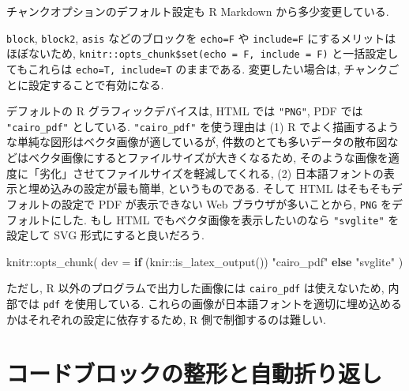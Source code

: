 \documentclass[
  xelatex,ja=standard,jafont=noto]{bxjsbook}
\newenvironment{Shaded}{\begin{snugshade}}{\end{snugshade}}
\newcommand{\AttributeTok}[1]{\textcolor[rgb]{0.77,0.63,0.00}{#1}}
\newcommand{\ControlFlowTok}[1]{\textcolor[rgb]{0.13,0.29,0.53}{\textbf{#1}}}
\newcommand{\FunctionTok}[1]{\textcolor[rgb]{0.00,0.00,0.00}{#1}}
\newcommand{\NormalTok}[1]{#1}
\newcommand{\SpecialCharTok}[1]{\textcolor[rgb]{0.00,0.00,0.00}{#1}}
\newcommand{\StringTok}[1]{\textcolor[rgb]{0.31,0.60,0.02}{#1}}
\theoremstyle{definition}
\theoremstyle{definition}
\theoremstyle{definition}
\theoremstyle{definition}
\theoremstyle{remark}
\begin{document}
チャンクオプションのデフォルト設定も R Markdown から多少変更している.

\texttt{block}, \texttt{block2}, \texttt{asis} などのブロックを
\texttt{echo=F} や \texttt{include=F} にするメリットはほぼないため,
\texttt{knitr::opts\_chunk\$set(echo\ =\ F,\ include\ =\ F)}
と一括設定してもこれらは \texttt{echo=T,\ include=T} のままである.
変更したい場合は, チャンクごとに設定することで有効になる.

デフォルトの R グラフィックデバイスは, HTML では \texttt{"PNG"}, PDF
では \texttt{"cairo\_pdf"} としている. \texttt{"cairo\_pdf"}
を使う理由は (1) R
でよく描画するような単純な図形はベクタ画像が適しているが,
件数のとても多いデータの散布図などはベクタ画像にするとファイルサイズが大きくなるため,
そのような画像を適度に「劣化」させてファイルサイズを軽減してくれる, (2)
日本語フォントの表示と埋め込みの設定が最も簡単, というものである. そして
HTML はそもそもデフォルトの設定で PDF が表示できない Web
ブラウザが多いことから, \texttt{PNG} をデフォルトにした. もし HTML
でもベクタ画像を表示したいのなら \texttt{"svglite"} を設定して SVG
形式にすると良いだろう.

\begin{Shaded}
\begin{Highlighting}[numbers=left,,]
\NormalTok{knitr}\SpecialCharTok{::}\FunctionTok{opts\_chunk}\NormalTok{(}
  \AttributeTok{dev =} \ControlFlowTok{if}\NormalTok{ (knir}\SpecialCharTok{::}\FunctionTok{is\_latex\_output}\NormalTok{()) }\StringTok{"cairo\_pdf"} \ControlFlowTok{else} \StringTok{"svglite"}
\NormalTok{)}
\end{Highlighting}
\end{Shaded}

ただし, R 以外のプログラムで出力した画像には \texttt{cairo\_pdf}
は使えないため, 内部では \texttt{pdf} を使用している.
これらの画像が日本語フォントを適切に埋め込めるかはそれぞれの設定に依存するため,
R 側で制御するのは難しい.

\hypertarget{autoformatter}{%
\section{コードブロックの整形と自動折り返し}\label{autoformatter}}
\end{document}
